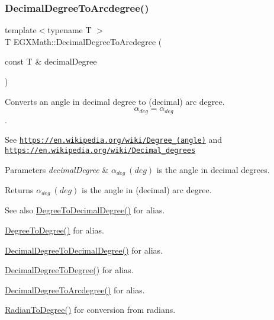 \subsubsection{\texorpdfstring{Decimal\+Degree\+To\+Arcdegree()}{DecimalDegreeToArcdegree()}}
{\footnotesize\ttfamily template$<$typename T $>$ \\
T E\+G\+X\+Math\+::\+Decimal\+Degree\+To\+Arcdegree (\begin{DoxyParamCaption}\item[{const T \&}]{decimal\+Degree }\end{DoxyParamCaption})}



Converts an angle in decimal degree to (decimal) arc degree. \[\alpha_{deg}=\alpha_{deg}\]. 

See \href{https://en.wikipedia.org/wiki/Degree_(angle)}{\tt https\+://en.\+wikipedia.\+org/wiki/\+Degree\+\_\+(angle)} and \href{https://en.wikipedia.org/wiki/Decimal_degrees}{\tt https\+://en.\+wikipedia.\+org/wiki/\+Decimal\+\_\+degrees} 
\begin{DoxyParams}{Parameters}
{\em decimal\+Degree} & $\alpha_{deg}\ (deg)$ is the angle in decimal degrees. \\
\hline
\end{DoxyParams}
\begin{DoxyReturn}{Returns}
$\alpha_{deg}\ (deg)$ is the angle in (decimal) arc degree. 
\end{DoxyReturn}
\begin{DoxySeeAlso}{See also}
\mbox{\hyperlink{group___e_g_x_math-_angle_conversions-_degree_ga568afc1d436d425bf5d4edea584aee08}{Degree\+To\+Decimal\+Degree()}} for alias. 

\mbox{\hyperlink{group___e_g_x_math-_angle_conversions-_degree_gaca157e7d3e99a46a11a04b92680d2574}{Degree\+To\+Degree()}} for alias. 

\mbox{\hyperlink{group___e_g_x_math-_angle_conversions-_decimal_degree_gafccf9cd779903872887978ab9d79661f}{Decimal\+Degree\+To\+Decimal\+Degree()}} for alias. 

\mbox{\hyperlink{group___e_g_x_math-_angle_conversions-_decimal_degree_ga0aa7f2f5dbb00cf4ab303421c6e33ccf}{Decimal\+Degree\+To\+Degree()}} for alias. 

\mbox{\hyperlink{group___e_g_x_math-_angle_conversions-_decimal_degree_gacdd463fcabffeb598ebda65b012ce743}{Decimal\+Degree\+To\+Arcdegree()}} for alias. 

\mbox{\hyperlink{group___e_g_x_math-_angle_conversions-_radian_ga25bbce6cdc1c3621f2a158d320e3bc45}{Radian\+To\+Degree()}} for conversion from radians. 
\end{DoxySeeAlso}
\mbox{\label{group___e_g_x_math-_angle_conversions-_decimal_degree_ga6b6ea6e45d2a13f556824ca419cc9fbd}} 
